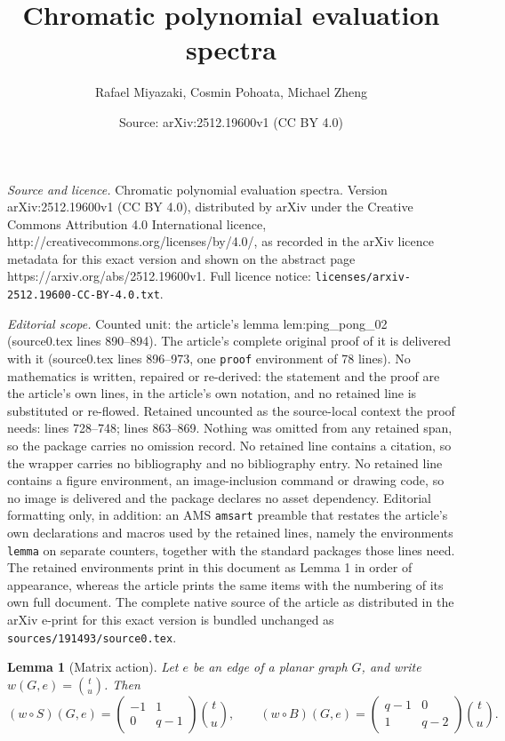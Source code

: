 \documentclass[10pt,a4paper]{amsart}
\title{Chromatic polynomial evaluation spectra}
\author{Rafael Miyazaki, Cosmin Pohoata, Michael Zheng}
\date{Source: arXiv:2512.19600v1 (CC BY 4.0)}
\newtheorem{lemma}{Lemma}
\begin{document}
\maketitle

\noindent\emph{Source and licence.} Chromatic polynomial evaluation spectra. Version arXiv:2512.19600v1 (CC BY 4.0), distributed by arXiv under the Creative Commons Attribution 4.0 International licence, http://creativecommons.org/licenses/by/4.0/, as recorded in the arXiv licence metadata for this exact version and shown on the abstract page https://arxiv.org/abs/2512.19600v1. Full licence notice: \texttt{licenses/arxiv-2512.19600-CC-BY-4.0.txt}.\par\smallskip

\noindent\textit{Editorial scope.} Counted unit: the article's lemma lem:ping\_pong\_02 (source0.tex lines 890--894). The article's complete original proof of it is delivered with it (source0.tex lines 896--973, one \texttt{proof} environment of 78 lines). No mathematics is written, repaired or re-derived: the statement and the proof are the article's own lines, in the article's own notation, and no retained line is substituted or re-flowed.  Retained uncounted as the source-local context the proof needs: lines 728--748; lines 863--869.  Nothing was omitted from any retained span, so the package carries no omission record.  No retained line contains a citation, so the wrapper carries no bibliography and no bibliography entry.  No retained line contains a figure environment, an image-inclusion command or drawing code, so no image is delivered and the package declares no asset dependency.  Editorial formatting only, in addition: an AMS \texttt{amsart} preamble that restates the article's own declarations and macros used by the retained lines, namely the environments \texttt{lemma} on separate counters, together with the standard packages those lines need.  The retained environments print in this document as Lemma 1 in order of appearance, whereas the article prints the same items with the numbering of its own full document.  The complete native source of the article as distributed in the arXiv e-print for this exact version is bundled unchanged as \texttt{sources/191493/source0.tex}.
\begin{lemma}[Matrix action]\label{lem:matrices-pos}
Let $e$ be an edge of a planar graph $G$, and write $w(G,e)=\binom{t}{u}$.
Then
\[
(w\circ S)(G,e)
=
\begin{pmatrix}
-1 & 1\\
0 & q-1
\end{pmatrix}
\binom{t}{u},
\qquad
(w\circ B)(G,e)
=
\begin{pmatrix}
q-1 & 0\\
1 & q-2
\end{pmatrix}
\binom{t}{u}.
\]
\end{lemma}
\end{document}
